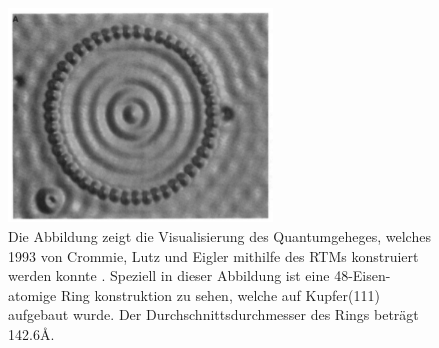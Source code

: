 \begin{figure}
\includegraphics[width=7cm]{pics/quantum_corral}
\caption{Die Abbildung zeigt die 
    Visualisierung des Quantumgeheges, welches 1993 von 
    Crommie, Lutz und Eigler mithilfe des RTMs 
    konstruiert werden konnte \cite{crommie1993imaging}. 
    Speziell in dieser Abbildung ist eine 48-Eisen-atomige 
Ring konstruktion zu sehen, welche auf Kupfer(111) aufgebaut wurde.
Der Durchschnittsdurchmesser des Rings beträgt 142.6\r{A}.}
 \label{fig:quantum_corral}
\end{figure}

